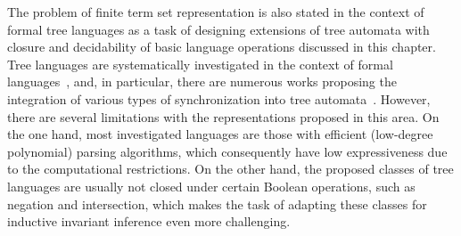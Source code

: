 The problem of finite term set representation is also stated in the context of formal tree languages as a task of designing extensions of tree automata with closure and decidability of basic language operations discussed in this chapter. Tree languages are systematically investigated in the context of formal languages~\cite{10.5555/267871}, and, in particular, there are numerous works proposing the integration of various types of synchronization into tree automata~\cite{chabin2007visibly, gouranton2001synchronized, limet2001weakly, chabin2006synchronized, jacquemard2009rigid, engelfriet2017multiple}. However, there are several limitations with the representations proposed in this area. On the one hand, most investigated languages are those with efficient (low-degree polynomial) parsing algorithms, which consequently have low expressiveness due to the computational restrictions. On the other hand, the proposed classes of tree languages are usually not closed under certain Boolean operations, such as negation and intersection, which makes the task of adapting these classes for inductive invariant inference even more challenging.



